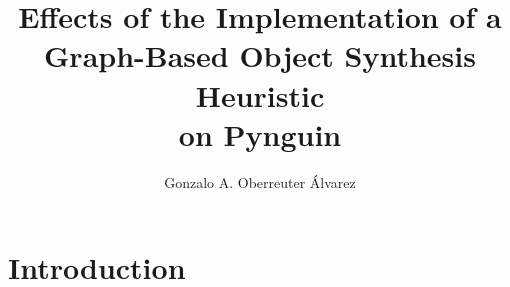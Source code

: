 \documentclass[%
  chapterprefix=false,%
  open=right,%
  twoside=true,%
  paper=a4,%
  logofile={Figures/logo.png},%
  thesistype=master,%
  UKenglish,%
]{se2thesis}
\author{Gonzalo A. Oberreuter Álvarez}
\title{Effects of the Implementation of a Graph-Based Object Synthesis Heuristic \\ on Pynguin}
\institute{Chair of Software Engineering}
\begin{document}
\frontmatter

\maketitle

\mainmatter{}

\chapter{Introduction}\label{chap:introduction}
\end{document}
